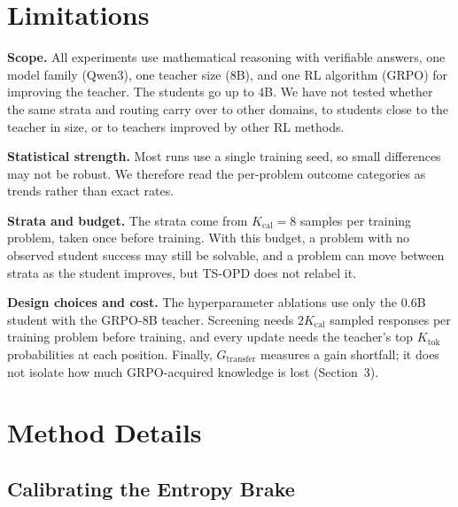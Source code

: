 \documentclass[10pt]{article}
\newcommand{\tsopd}{TS-OPD}
\newcommand{\Gt}{G_{\mathrm{transfer}}}
\begin{document}
\section*{Limitations}

\textsf{\textbf{Scope.}} All experiments use mathematical reasoning with verifiable
answers, one model family (Qwen3), one teacher size (8B), and one RL algorithm
(GRPO) for improving the teacher. The students go up to 4B. We have not tested
whether the same strata and routing carry over to other domains, to students
close to the teacher in size, or to teachers improved by other RL methods.

\textsf{\textbf{Statistical strength.}} Most runs use a single training seed, so small
differences may not be
robust. We therefore read the per-problem outcome categories as
trends rather than exact rates.

\textsf{\textbf{Strata and budget.}} The strata come from $K_{\mathrm{cal}}=8$
samples per training problem, taken once before training. With this budget, a
problem with no observed student success may still be solvable, and a problem
can move between strata as the student improves, but \tsopd{} does not relabel
it.

\textsf{\textbf{Design choices and cost.}} The hyperparameter ablations use only the
0.6B student with the GRPO-8B teacher.
Screening needs $2K_{\mathrm{cal}}$ sampled responses per training problem
before training, and every update needs the teacher's top $K_{\mathrm{tok}}$
probabilities at each position. Finally, $\Gt$ measures a gain shortfall; it
does not isolate how much GRPO-acquired knowledge is lost (Section~3).




\clearpage
\appendix

\section{Method Details}
\label{app:method}

\subsection{Calibrating the Entropy Brake}
\label{app:beta}
\end{document}
